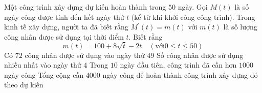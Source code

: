 \begin{ex}%

	Một công trình xây dựng dự kiến hoàn thành trong $50$ ngày. Gọi $M(t)$ là số ngày công được tính đến hết ngày thứ $t$ (kể từ khi khởi công công trình). Trong kinh tế xây dựng, người ta đã biết rằng $M^{\prime}(t)=m(t)$ với $m(t)$ là số lượng công nhân được sử dụng tại thời điểm $t$. Biết rằng
	$$
	m(t)=100+8\sqrt{t}-2t \quad(\text{với} 0 \leq t \leq 50)
	$$
	\choiceTF
	{ Có $72$ công nhân được sử dụng vào ngày thứ $49$}
	{\True Số công nhân được sử dụng nhiều nhất vào ngày thứ $4$}
	{\True Trong $10$ ngày đầu tiên, công trình đã cần hơn $1000$ ngày công}
	{Tổng cộng cần $4000$ ngày công để hoàn thành công trình xây dựng đó theo dự kiến}
\end{ex}

